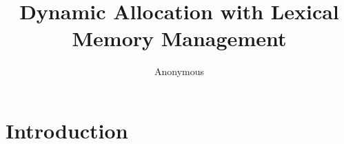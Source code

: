 \documentclass[12pt]{article}
\title{
    Dynamic Allocation with Lexical Memory Management
}
\author{Anonymous}
\begin{document}
\maketitle

\begin{abstract}
\end{abstract}


\section{Introduction}
\label{sec.introduction}



\end{document}
